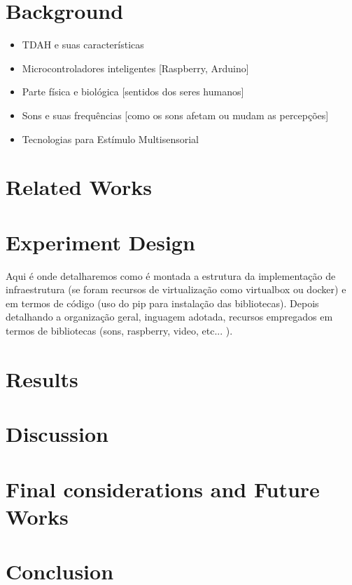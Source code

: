\documentclass[11pt,a4paper]{article}
\begin{document}
\section{Background}

    \begin{itemize}
        \item TDAH e suas características
        \item Microcontroladores inteligentes [Raspberry, Arduino]
        \item Parte física e biológica [sentidos dos seres humanos]
        \item Sons e suas frequências [como os sons afetam ou mudam as percepções]
        \item Tecnologias para Estímulo Multisensorial
    \end{itemize}

\section{Related Works}

\section{Experiment Design}
    Aqui é onde detalharemos como é montada a estrutura da implementação de infraestrutura (se foram recursos de  virtualização como virtualbox ou docker) e em termos de código (uso do pip para instalação das bibliotecas). Depois detalhando a organização geral, inguagem adotada, recursos empregados em termos de bibliotecas (sons, raspberry, video, etc... ).

\section{Results}

\section{Discussion}

\section{Final considerations and Future Works}

\section{Conclusion}
\end{document}

